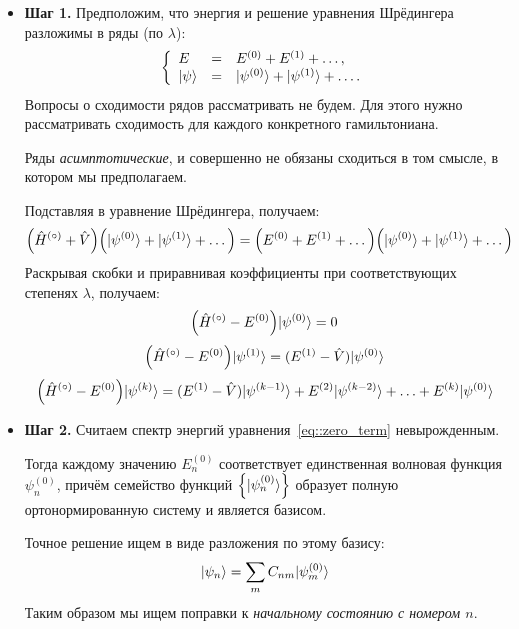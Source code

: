\begin{itemize}
  \item \textbf{Шаг 1.} Предположим, что энергия и решение уравнения Шрёдингера разложимы в ряды (по $\lambda$):
  $$
  \left\{
    \begin{array}{lcl}
      E & = & E^{(0)} + E^{(1)} + \ldots ,\\
      | \psi \rangle & = & | \psi^{(0)} \rangle +  | \psi^{(1)} \rangle + \ldots.
    \end{array}
  \right.
  $$
  Вопросы о сходимости рядов рассматривать не будем. Для этого нужно рассматривать сходимость для каждого конкретного гамильтониана.

  Ряды \emph{асимптотические}, и совершенно не обязаны сходиться в том смысле, в котором мы предполагаем.

  Подставляя в уравнение Шрёдингера, получаем:
  $$
    \Big(\hat H^{(\circ)} + \hat V\Big)
    \Big(
        | \psi^{(0)} \rangle + | \psi^{(1)} \rangle + \ldots
    \Big) =
    \Big(
        E^{(0)} + E^{(1)} + \ldots
    \Big) \Big(
        | \psi^{(0)} \rangle + | \psi^{(1)} \rangle + \ldots
    \Big)
  $$
  Раскрывая скобки и приравнивая коэффициенты при соответствующих степенях $\lambda$, получаем:
  \begin{equation}
      \Big(
        \Hat H^{(\circ)} - E^{(0)}
    \Big) | \psi^{(0)} \rangle = 0
    \label{eq::zero_term}
  \end{equation}
  \begin{equation}
      \Big(
        \hat H^{(\circ)} - E^{(0)}
    \Big) | \psi^{(1)} \rangle = (E^{(1)} - \hat V) | \psi^{(0)} \rangle
    \label{eq::first_term}
  \end{equation}
  \begin{equation}
	    \Big(
        \hat H^{(\circ)} - E^{(0)}
    \Big) | \psi^{(k)} \rangle = (E^{(1)} - \hat V) | \psi^{(k-1)} \rangle + E^{(2)} | \psi^{(k-2)} \rangle + \ldots + E^{(k)} | \psi^{(0)} \rangle
    \label{eq::k_term}  
  \end{equation}
  \item \textbf{Шаг 2.} Считаем спектр энергий уравнения~\eqref{eq::zero_term} невырожденным.

  Тогда каждому значению $E_n^{(0)}$ соответствует единственная волновая функция $\psi_n^{(0)}$, причём семейство функций $\Big\{ | \psi_n^{(0)} \rangle \Big\}$ образует полную ортонормированную систему и является базисом.
  
  Точное решение ищем в виде разложения по этому базису:
  $$
    | \psi_n \rangle = \sum_{m} C_{nm} | \psi_{m}^{(0)} \rangle
  $$
  Таким образом мы ищем поправки к \emph{начальному состоянию с номером $n$}.
  

\end{itemize}

